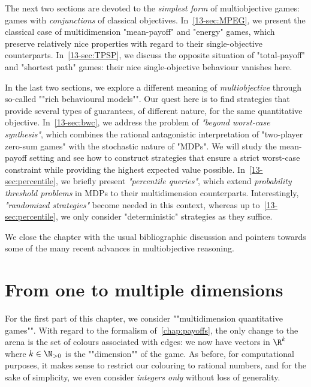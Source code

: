 The next two sections are devoted to the \emph{simplest form} of multiobjective games: games with \emph{conjunctions} of classical objectives. In~\cref{13-sec:MPEG}, we present the classical case of multidimension "mean-payoff" and "energy" games, which preserve relatively nice properties with regard to their single-objective counterparts. In~\cref{13-sec:TPSP}, we discuss the opposite situation of "total-payoff" and "shortest path" games: their nice single-objective behaviour vanishes here.

In the last two sections, we explore a different meaning of \emph{multiobjective} through so-called ""rich behavioural models"". Our quest here is to find strategies that provide several types of guarantees, of different nature, for the same quantitative objective. In~\cref{13-sec:bwc}, we address the problem of \emph{"beyond worst-case synthesis"}, which combines the rational antagonistic interpretation of "two-player zero-sum games" with the stochastic nature of "MDPs". We will study the mean-payoff setting and see how to construct strategies that ensure a strict worst-case constraint while providing the highest expected value possible.
In~\cref{13-sec:percentile}, we briefly present \emph{"percentile queries"}, which extend \textit{probability threshold problems} in MDPs to their multidimension counterparts.  Interestingly, \emph{"randomized strategies"} become needed in this context, whereas up to~\cref{13-sec:percentile}, we only consider "deterministic" strategies as they suffice.

We close the chapter with the usual bibliographic discussion and pointers towards some of the many recent advances in multiobjective reasoning.

\section{From one to multiple dimensions}
\label{13-sec:fromOne}


For the first part of this chapter, we consider ""multidimension quantitative games"". With regard to the formalism of~\cref{chap:payoffs}, the only change to the arena is the set of colours associated with edges: we now have vectors in $\R^k$ where $k \in \N_{>0}$ is the ""dimension"" of the game. As before, for computational purposes, it makes sense to restrict our colouring to rational numbers, and for the sake of simplicity, we even consider \emph{integers only} without loss of generality.

